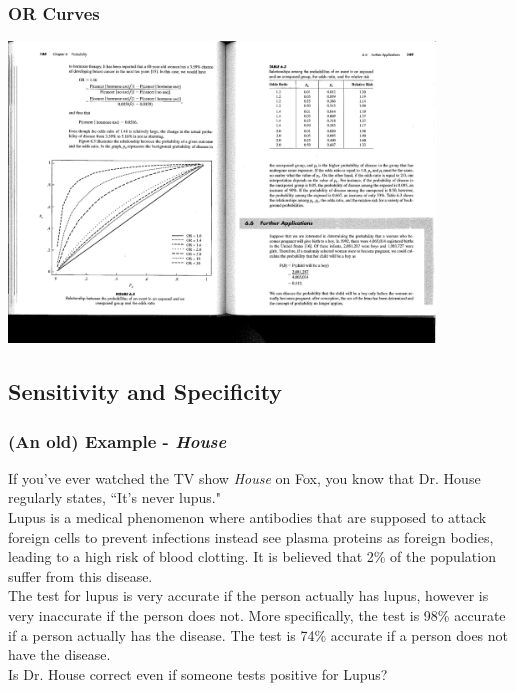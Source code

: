 
\begin{frame}
\frametitle{OR Curves}

\vspace{-5mm}

\begin{center}
\includegraphics[width=0.85\textwidth]{9-5_logistic_reg/figures/all_OR.pdf}
\end{center}

\end{frame}


\subsection{Sensitivity and Specificity}


\begin{frame}
\frametitle{(An old) Example - \emph{House}}

If you've ever watched the TV show \emph{House} on Fox, you know that Dr. House regularly states, ``It's never lupus." \\
\vspace{3mm}
Lupus is a medical phenomenon where antibodies that are supposed to attack foreign cells to prevent infections instead see plasma proteins as foreign bodies, leading to a high risk of blood clotting. It is believed that 2\% of the population suffer from this disease. \\
\vspace{3mm}
The test for lupus is very accurate if the person actually has lupus, however is very inaccurate if the person does not. More specifically, the test is 98\% accurate if a person actually has the disease. The test is 74\% accurate if a person does not have the disease. \\
\vspace{3mm}
Is Dr. House correct even if someone tests positive for Lupus? 

\end{frame}


